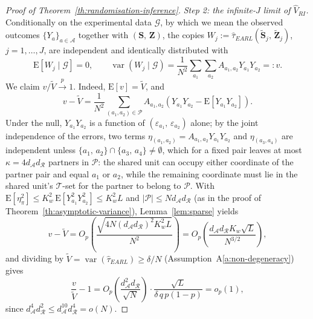\documentclass[sigconf]{acmart}
\newcommand{\E}{\mathrm E}
\DeclareMathOperator{\var}{var}
\begin{document}
\begin{proof}[Proof of Theorem~\ref{th:randomisation-inference}]
    \emph{Step 2: the infinite-$J$ limit of $\hat V_{RI}$.} Conditionally on the experimental data $\mathcal G$, by which we mean the observed outcomes $\{Y_a\}_{a\in\mathcal A}$ together with $(\mathbf S,\,\mathbf Z)$, the copies $W_j := \hat\tau_{EARL}(\tilde{\mathbf S}_j,\,\tilde{\mathbf Z}_j)$, $j=1,\ldots,J$, are independent and identically distributed with
    \begin{equation}\label{eq:vD}
        \E[W_j\mid \mathcal G] = 0,\qquad \var(W_j\mid\mathcal G) = \frac 1{N^2}\sum_{a_1}\sum_{a_2}A_{a_1,a_2}Y_{a_1}Y_{a_2} =: v.
    \end{equation}
    We claim $v/\tilde V\stackrel{p}{\to}1$. Indeed, $\E[v]=\tilde V$, and
    \begin{equation*}
        v - \tilde V = \frac 1{N^2}\sum_{(a_1,a_2)\in\mathcal P}A_{a_1,a_2}\left(Y_{a_1}Y_{a_2} - \E[Y_{a_1}Y_{a_2}]\right).
    \end{equation*}
    Under the null, $Y_{a_1}Y_{a_2}$ is a function of $(\varepsilon_{a_1},\,\varepsilon_{a_2})$ alone; by the joint independence of the errors, two terms $\eta_{(a_1,a_2)} = A_{a_1,a_2}Y_{a_1}Y_{a_2}$ and $\eta_{(a_3,a_4)}$ are independent unless $\{a_1,\,a_2\}\cap\{a_3,\,a_4\}\neq\emptyset$, which for a fixed pair leaves at most $\kappa = 4d_{\mathcal A}d_{\mathcal R}$ partners in $\mathcal P$: the shared unit can occupy either coordinate of the partner pair and equal $a_1$ or $a_2$, while the remaining coordinate must lie in the shared unit's $\mathcal T$-set for the partner to belong to $\mathcal P$. With $\E[\eta_\pi^2]\le K_w^2\,\E[Y_{a_1}^2Y_{a_2}^2]\le K_w^2L$ and $|\mathcal P|\le Nd_{\mathcal A}d_{\mathcal R}$ (as in the proof of Theorem~\ref{th:asymptotic-variance}), Lemma~\ref{lem:sparse} yields
    \begin{equation*}
        v - \tilde V = O_p\left(\frac{\sqrt{4N(d_{\mathcal A}d_{\mathcal R})^2K_w^2L}}{N^2}\right) = O_p\left(\frac{d_{\mathcal A}d_{\mathcal R}K_w\sqrt L}{N^{3/2}}\right),
    \end{equation*}
    and dividing by $\tilde V = \var(\hat\tau_{EARL})\ge \delta/N$ (Assumption~A\ref{a:non-degeneracy}) gives
    \begin{equation}\label{eq:v-ratio}
        \frac{v}{\tilde V} - 1 = O_p\left(\frac{d^2_{\mathcal A}d_{\mathcal R}}{\sqrt N}\right)\cdot\frac{\sqrt L}{\delta\, q\,p(1-p)} = o_p(1),
    \end{equation}
    since $d^4_{\mathcal A}d^2_{\mathcal R}\le d^{10}_{\mathcal A}d^4_{\mathcal R} = o(N)$.


\end{proof}
\end{document}
